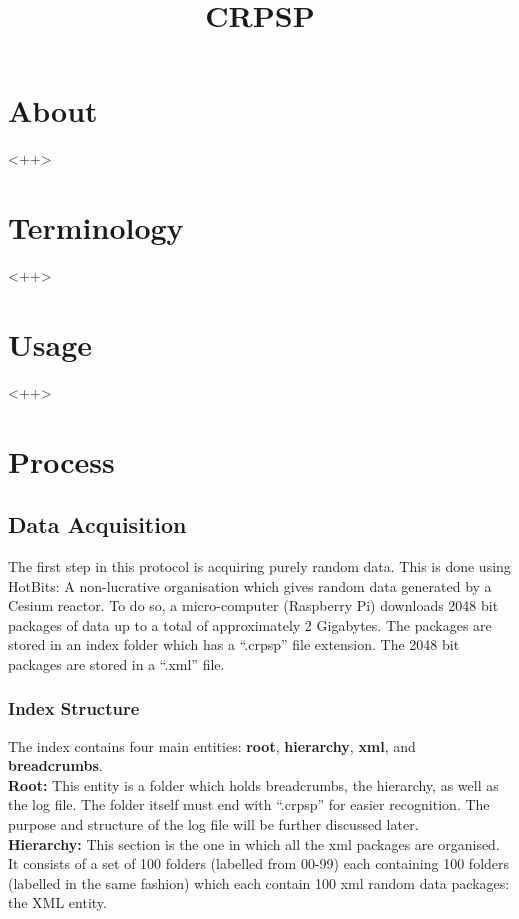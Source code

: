 \documentclass[11pt, A4]{article}
\title{CRPSP}
\begin{document}
\maketitle
\tableofcontents
\newpage

\section{About}
<++>

\section{Terminology}
<++>

\section{Usage}
<++>

\section{Process}
\subsection{Data Acquisition}
The first step in this protocol is acquiring purely random data. This is done
using HotBits: A non-lucrative organisation which gives random data generated
by a Cesium reactor. To do so, a micro-computer (Raspberry Pi) downloads
2048 bit packages of data up to a total of approximately 2 Gigabytes. The
packages are stored in an index folder which has a ``.crpsp'' file extension.
The 2048 bit packages are stored in a ``.xml'' file.

\subsubsection{Index Structure}
The index contains four main entities: \textbf{root}, \textbf{hierarchy},
\textbf{xml}, and \textbf{breadcrumbs}. \\

\textbf{Root:} This entity is a folder which holds breadcrumbs, the hierarchy,
as well as the log file. The folder itself must end with ``.crpsp''
for easier recognition. The purpose and structure of the log file will be
further discussed later. \\

\textbf{Hierarchy:} This section is the one in which all the xml packages are
organised. It consists of a set of 100 folders (labelled from 00-99)
each containing 100 folders (labelled in the same fashion) which each
contain 100 xml random data packages: the XML entity.\\  %
\end{document}
